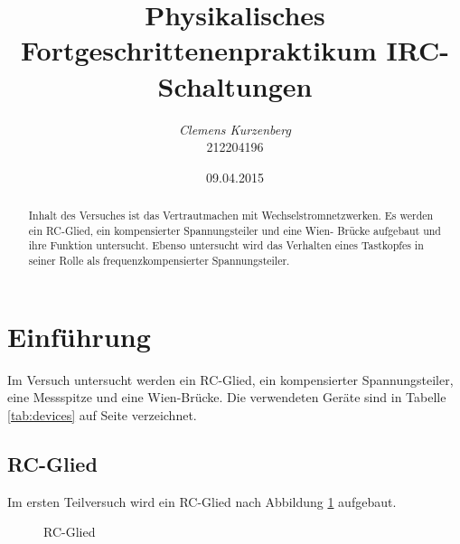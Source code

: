 \documentclass[10pt,a4paper]{scrartcl}
\title {Physikalisches Fortgeschrittenenpraktikum I\linebreak RC-Schaltungen}
\author {\emph{Clemens Kurzenberg}\\212204196}
\date {09.04.2015}
\begin{document}
\maketitle

\begin{abstract}
Inhalt des Versuches ist das Vertrautmachen mit Wechselstromnetzwerken.
Es werden ein RC-Glied, ein kompensierter Spannungsteiler und eine Wien-
Brücke aufgebaut und ihre Funktion untersucht.
Ebenso untersucht wird das Verhalten eines Tastkopfes in seiner Rolle als
frequenzkompensierter Spannungsteiler.
\end{abstract}

\tableofcontents

\pagebreak
\section {Einführung}

Im Versuch untersucht werden ein RC-Glied, ein kompensierter Spannungsteiler,
eine Messspitze und eine Wien-Brücke.
Die verwendeten Geräte sind in Tabelle \ref{tab:devices} auf Seite 
\pageref{tab:devices} verzeichnet.

\subsection {RC-Glied}

Im ersten Teilversuch wird ein RC-Glied nach Abbildung \ref{fig:RC} aufgebaut.

\begin{figure}[!ht]
    \centering
    \caption{RC-Glied} \label{fig:RC}
\end{figure}
\end{document}
